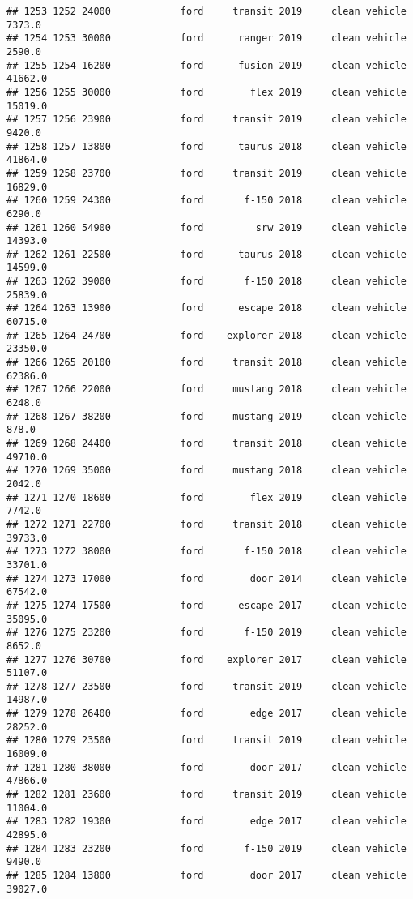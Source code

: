 \documentclass[
]{article}
\begin{document}
\begin{verbatim}
## 1253 1252 24000            ford     transit 2019     clean vehicle    7373.0
## 1254 1253 30000            ford      ranger 2019     clean vehicle    2590.0
## 1255 1254 16200            ford      fusion 2019     clean vehicle   41662.0
## 1256 1255 30000            ford        flex 2019     clean vehicle   15019.0
## 1257 1256 23900            ford     transit 2019     clean vehicle    9420.0
## 1258 1257 13800            ford      taurus 2018     clean vehicle   41864.0
## 1259 1258 23700            ford     transit 2019     clean vehicle   16829.0
## 1260 1259 24300            ford       f-150 2018     clean vehicle    6290.0
## 1261 1260 54900            ford         srw 2019     clean vehicle   14393.0
## 1262 1261 22500            ford      taurus 2018     clean vehicle   14599.0
## 1263 1262 39000            ford       f-150 2018     clean vehicle   25839.0
## 1264 1263 13900            ford      escape 2018     clean vehicle   60715.0
## 1265 1264 24700            ford    explorer 2018     clean vehicle   23350.0
## 1266 1265 20100            ford     transit 2018     clean vehicle   62386.0
## 1267 1266 22000            ford     mustang 2018     clean vehicle    6248.0
## 1268 1267 38200            ford     mustang 2019     clean vehicle     878.0
## 1269 1268 24400            ford     transit 2018     clean vehicle   49710.0
## 1270 1269 35000            ford     mustang 2018     clean vehicle    2042.0
## 1271 1270 18600            ford        flex 2019     clean vehicle    7742.0
## 1272 1271 22700            ford     transit 2018     clean vehicle   39733.0
## 1273 1272 38000            ford       f-150 2018     clean vehicle   33701.0
## 1274 1273 17000            ford        door 2014     clean vehicle   67542.0
## 1275 1274 17500            ford      escape 2017     clean vehicle   35095.0
## 1276 1275 23200            ford       f-150 2019     clean vehicle    8652.0
## 1277 1276 30700            ford    explorer 2017     clean vehicle   51107.0
## 1278 1277 23500            ford     transit 2019     clean vehicle   14987.0
## 1279 1278 26400            ford        edge 2017     clean vehicle   28252.0
## 1280 1279 23500            ford     transit 2019     clean vehicle   16009.0
## 1281 1280 38000            ford        door 2017     clean vehicle   47866.0
## 1282 1281 23600            ford     transit 2019     clean vehicle   11004.0
## 1283 1282 19300            ford        edge 2017     clean vehicle   42895.0
## 1284 1283 23200            ford       f-150 2019     clean vehicle    9490.0
## 1285 1284 13800            ford        door 2017     clean vehicle   39027.0

\end{verbatim}
\end{document}
